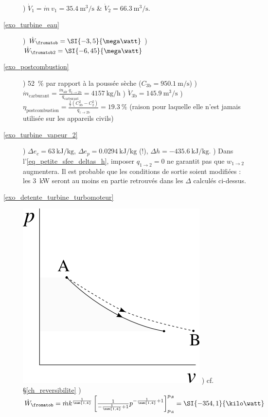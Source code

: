 \begin{description}
					) $\dot{V}_1 = \dot m \ v_1 = \SI{35,4}{\metre\cubed\per\second}$ \& $\dot{V}_2 = \SI{66,3}{\metre\cubed\per\second}$.
	\item [\ref{exo_turbine_eau}]
					) $\dot{W}_\fromatob = \SI{-3,5}{\mega\watt}$
					) $\dot{W}_{\fromatob2} = \SI{-6,45}{\mega\watt}$
	\item [\ref{exo_postcombustion}] 
					) \SI{+52}{\percent} par rapport à la poussée sèche ($C_{3\text{b}} = \SI{950,1}{\metre\per\second}$)
					) $\dot{m}_\text{carburant} = \frac{\dot{m}_\text{air} \ q_{1\to 2\text{b}}}{q_\text{carburant}} = \SI[per-mode=symbol]{4157}{\kilogram\per\hour}$
					) $\dot{V}_{3\text{b}} = \SI{145,9}{\metre\cubed\per\second} $
					) $\eta_\text{postcombustion} = \frac{\frac{1}{2}\left(C_{3\text{b}}^2 - C_2^2\right)}{q_{1\to 2\text{b}}} =  \SI{19,3}{\percent}$ (raison pour laquelle elle n’est jamais utilisée sur les appareils civils)
	\item [\ref{exo_turbine_vapeur_2}]
					) $\Delta e_c = \SI{+63}{\kilo\joule\per\kilogram}$, $\Delta e_p = \SI{+0,0294}{\kilo\joule\per\kilogram}$ (!), $\Delta h = \SI{-435,6}{\kilo\joule\per\kilogram}$.
					) Dans l’\cref{eq_petite_sfee_deltas_h}, imposer $q_{1 \to 2} = 0$ ne garantit pas que $w_{1 \to 2}$ augmentera. Il est probable que les conditions de sortie soient modifiées : les \SI{3}{\kilo\watt} seront au moins en partie retrouvés dans les $\Delta$ calculés ci-dessus.
	\item [\ref{exo_detente_turbine_turbomoteur}]
					\includegraphics[width=\solutiondiagramwidth]{images/exo_pv_2.png}
					) cf. \S\ref{ch_reversibilite}
					) $\dot{W}_\fromatob = \dot m k^{\frac{1}{\num{1,4}}} \left[\frac{1}{-\frac{1}{\num{1,4}} +1} p^{-\frac{1}{\num{1,4}} +1}\right]_{p_\A}^{p_\B} = \SI{-354,1}{\kilo\watt}$

\end{description}
